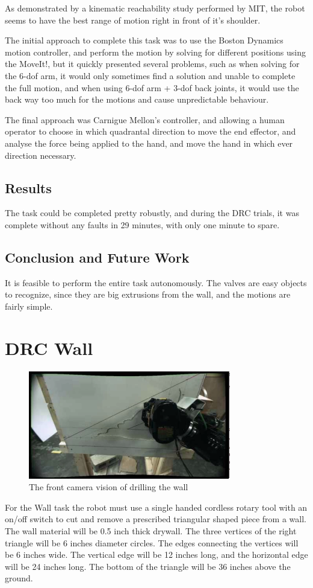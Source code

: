 \documentclass[12pt]{report}
\begin{document}
As demonstrated by a kinematic reachability study performed by MIT, the robot seems to have the best range of motion right in front of it's shoulder. \cite{mitaffordance} 

The initial approach to complete this task was to use the Boston Dynamics motion controller, and perform the motion by solving for different positions using the MoveIt!, but it quickly presented several problems, such as when solving for the 6-dof arm, it would only sometimes find a solution and unable to complete the full motion, and when using 6-dof arm + 3-dof back joints, it would use the back way too much for the motions and cause unpredictable behaviour. 

The final approach was Carnigue Mellon's controller, and allowing a human operator to choose in which quadrantal direction to move the end effector, and analyse the force being applied to the hand, and move the hand in which ever direction necessary. 

\subsection{Results}
The task could be completed pretty robustly, and during the DRC trials, it was complete without any faults in 29 minutes, with only one minute to spare. 

\subsection{Conclusion and Future Work}
It is feasible to perform the entire task autonomously. The valves are easy objects to recognize, since they are big extrusions from the wall, and the motions are fairly simple. 

\section{DRC Wall}
\begin{figure}
  \begin{center}
    \includegraphics[scale=0.5]{images/drilling2.png}
  \end{center}
  \caption{The front camera vision of drilling the wall}
\end{figure}
For the Wall task the robot must use a single handed cordless rotary tool with an on/off switch to cut and remove a prescribed triangular shaped piece from a wall. The wall material will be 0.5 inch thick drywall. The three vertices of the right triangle will be 6 inches diameter circles. The edges connecting the vertices will be 6 inches wide. The vertical edge will be 12 inches long, and the horizontal edge will be 24 inches long. The bottom of the triangle will be 36 inches above the ground. \cite{walltask}
\end{document}
